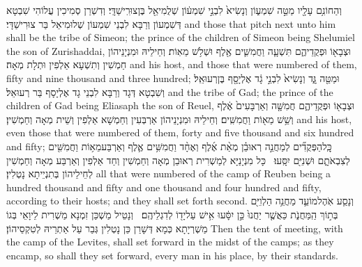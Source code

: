 {וְהַחוֹנִ֥ם עָלָ֖יו מַטֵּ֣ה שִׁמְע֑וֹן וְנָשִׂיא֙ לִבְנֵ֣י שִׁמְע֔וֹן שְׁלֻמִיאֵ֖ל בֶּן\maqqaf צוּרִֽישַׁדָּֽי׃}
{וְדִשְׁרַן סְמִיכִין עֲלוֹהִי שִׁבְטָא דְּשִׁמְעוֹן וְרַבָּא לִבְנֵי שִׁמְעוֹן שְׁלוּמִיאֵל בַּר צוּרִישַׁדָּי׃}
{and those that pitch next unto him shall be the tribe of Simeon; the prince of the children of Simeon being Shelumiel the son of Zurishaddai,}{}
{וּצְבָא֖וֹ וּפְקֻדֵיהֶ֑ם תִּשְׁעָ֧ה וַחֲמִשִּׁ֛ים אֶ֖לֶף וּשְׁלֹ֥שׁ מֵאֽוֹת׃}
{וְחֵילֵיהּ וּמִנְיָנֵיהוֹן חַמְשִׁין וְתִשְׁעָא אַלְפִין וּתְלָת מְאָה׃}
{and his host, and those that were numbered of them, fifty and nine thousand and three hundred;}{}
{וּמַטֵּ֖ה גָּ֑ד וְנָשִׂיא֙ לִבְנֵ֣י גָ֔ד אֶלְיָסָ֖ף בֶּן\maqqaf רְעוּאֵֽל׃}
{וְשִׁבְטָא דְּגָד וְרַבָּא לִבְנֵי גָד אֶלְיָסָף בַּר רְעוּאֵל׃}
{and the tribe of Gad; the prince of the children of Gad being Eliasaph the son of Reuel,}{}
{וּצְבָא֖וֹ וּפְקֻדֵיהֶ֑ם חֲמִשָּׁ֤ה וְאַרְבָּעִים֙ אֶ֔לֶף וְשֵׁ֥שׁ מֵא֖וֹת וַחֲמִשִּֽׁים׃}
{וְחֵילֵיהּ וּמִנְיָנֵיהוֹן אַרְבְּעִין וְחַמְשָׁא אַלְפִין וְשֵׁית מְאָה וְחַמְשִׁין׃}
{and his host, even those that were numbered of them, forty and five thousand and six hundred and fifty;}{}
{כׇּֽל\maqqaf הַפְּקֻדִ֞ים לְמַחֲנֵ֣ה רְאוּבֵ֗ן מְאַ֨ת אֶ֜לֶף וְאֶחָ֨ד וַחֲמִשִּׁ֥ים אֶ֛לֶף וְאַרְבַּע\maqqaf מֵא֥וֹת וַחֲמִשִּׁ֖ים לְצִבְאֹתָ֑ם וּשְׁנִיִּ֖ם יִסָּֽעוּ׃ \setuma }
{כָּל מִנְיָנַיָּא לְמַשְׁרִית רְאוּבֵן מְאָה וְחַמְשִׁין וְחַד אַלְפִין וְאַרְבַּע מְאָה וְחַמְשִׁין לְחֵילֵיהוֹן בְּתִנְיֵיתָא נָטְלִין׃}
{all that were numbered of the camp of Reuben being a hundred thousand and fifty and one thousand and four hundred and fifty, according to their hosts; and they shall set forth second.}{}
{וְנָסַ֧ע אֹֽהֶל\maqqaf מוֹעֵ֛ד מַחֲנֵ֥ה הַלְוִיִּ֖ם בְּת֣וֹךְ הַֽמַּחֲנֹ֑ת כַּאֲשֶׁ֤ר יַחֲנוּ֙ כֵּ֣ן יִסָּ֔עוּ אִ֥ישׁ עַל\maqqaf יָד֖וֹ לְדִגְלֵיהֶֽם׃ \setuma }
{וְנָטֵיל מַשְׁכַּן זִמְנָא מַשְׁרִית לֵיוָאֵי בְּגוֹ מַשְׁרְיָתָא כְּמָא דְּשָׁרַן כֵּן נָטְלִין גְּבַר עַל אַתְרֵיהּ לְטִקְסֵיהוֹן׃}
{Then the tent of meeting, with the camp of the Levites, shall set forward in the midst of the camps; as they encamp, so shall they set forward, every man in his place, by their standards.}{}
